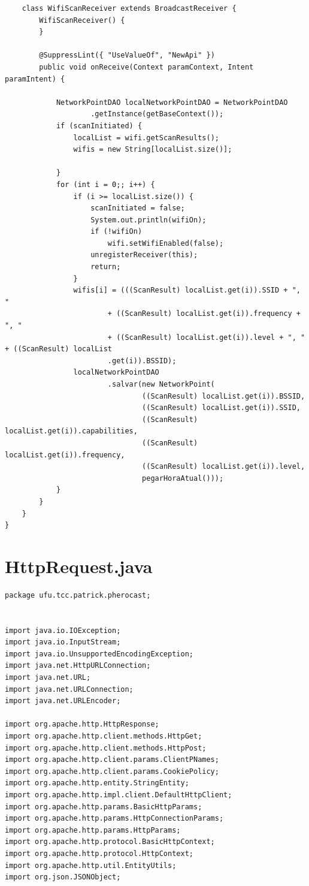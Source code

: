 \documentclass[12pt, %
openright, 
oneside, %
a4paper,    %
brazil]{facom-ufu-abntex2}
\begin{document}
\begin{anexosenv}
\begin{lstlisting}
	class WifiScanReceiver extends BroadcastReceiver {
		WifiScanReceiver() {
		}

		@SuppressLint({ "UseValueOf", "NewApi" })
		public void onReceive(Context paramContext, Intent paramIntent) {

			NetworkPointDAO localNetworkPointDAO = NetworkPointDAO
					.getInstance(getBaseContext());
			if (scanInitiated) {
				localList = wifi.getScanResults();
				wifis = new String[localList.size()];

			}
			for (int i = 0;; i++) {
				if (i >= localList.size()) {
					scanInitiated = false;
					System.out.println(wifiOn);
					if (!wifiOn)
						wifi.setWifiEnabled(false);
					unregisterReceiver(this);
					return;
				}
				wifis[i] = (((ScanResult) localList.get(i)).SSID + ", "
						+ ((ScanResult) localList.get(i)).frequency + ", "
						+ ((ScanResult) localList.get(i)).level + ", " + ((ScanResult) localList
						.get(i)).BSSID);
				localNetworkPointDAO
						.salvar(new NetworkPoint(
								((ScanResult) localList.get(i)).BSSID,
								((ScanResult) localList.get(i)).SSID,
								((ScanResult) localList.get(i)).capabilities,
								((ScanResult) localList.get(i)).frequency,
								((ScanResult) localList.get(i)).level,
								pegarHoraAtual()));
			}
		}
	}
}
\end{lstlisting}
\section{HttpRequest.java}
\begin{lstlisting}
package ufu.tcc.patrick.pherocast;


import java.io.IOException;
import java.io.InputStream;
import java.io.UnsupportedEncodingException;
import java.net.HttpURLConnection;
import java.net.URL;
import java.net.URLConnection;
import java.net.URLEncoder;

import org.apache.http.HttpResponse;
import org.apache.http.client.methods.HttpGet;
import org.apache.http.client.methods.HttpPost;
import org.apache.http.client.params.ClientPNames;
import org.apache.http.client.params.CookiePolicy;
import org.apache.http.entity.StringEntity;
import org.apache.http.impl.client.DefaultHttpClient;
import org.apache.http.params.BasicHttpParams;
import org.apache.http.params.HttpConnectionParams;
import org.apache.http.params.HttpParams;
import org.apache.http.protocol.BasicHttpContext;
import org.apache.http.protocol.HttpContext;
import org.apache.http.util.EntityUtils;
import org.json.JSONObject;


\end{lstlisting}
\end{anexosenv}
\end{document}
